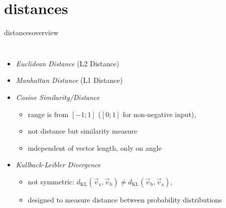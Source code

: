     \section{distances}
        \begin{frame}{distances}{overview }
            \vspace{-5mm}
             \begin{columns}
                    \begin{itemize}
                        \item<1->	\emph{{Euclidean Distance}} (L2 Distance)
                        \smallskip
                        \item<2->	\emph{{Manhattan Distance}} (L1 Distance)
                        \smallskip
                        \item<3->	\emph{{Cosine Similarity/Distance}}
                                \begin{itemize}
                                    \item   range is from $[-1;1]$ ($[0;1]$ for non-negative input),
                                    \item   not distance but similarity measure
                                    \item   independent of vector length, only on angle
                                \end{itemize}
                        \smallskip
                        \item<4->	\emph{Kullback-Leibler Divergence}
                                \begin{itemize}
                                    \item   not symmetric: $d_\mathrm{KL}(\vec{v}_\mathrm{a},\vec{v}_\mathrm{b})\neq d_\mathrm{KL}(\vec{v}_\mathrm{b},\vec{v}_\mathrm{a})$,
                                    \item   designed to measure distance between probability distributions
                                \end{itemize}
                            \end{itemize}
\end{columns}
\end{frame}
